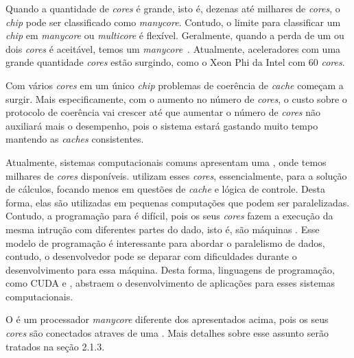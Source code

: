 Quando a quantidade de \textit{cores} é grande, isto é, dezenas até milhares de
\textit{cores}, o \textit{chip} pode ser classificado como \textit{manycore}.
Contudo, o limite para classificar um \textit{chip} em \textit{manycore} ou
\textit{multicore} é flexível. Geralmente, quando a perda de um ou dois
\textit{cores} é aceitável, temos um \textit{manycore}~\cite{Tanenbaum2015}.
Atualmente, aceleradores com uma grande quantidade \textit{cores} estão
surgindo, como o Xeon Phi da Intel com 60 \textit{cores}.

Com vários \textit{cores} em um único \textit{chip} problemas de coerência de
\textit{cache} começam a surgir. Mais especificamente, com o aumento no número
de \textit{cores}, o custo sobre o protocolo de coerência vai crescer até que
aumentar o número de \textit{cores} não auxiliará mais o desempenho, pois o sistema
estará gastando muito tempo mantendo as \textit{caches} consistentes.


Atualmente, sistemas computacionais comuns apresentam uma \gpu, onde temos
milhares de \textit{cores} disponíveis. \gpus utilizam esses \textit{cores},
essencialmente, para a solução de cálculos, focando menos em questões de
\textit{cache} e lógica de controle. Desta forma, elas são utilizadas em
pequenas computações que podem ser paralelizadas. Contudo, a programação para
\gpus é difícil, pois os seus \textit{cores} fazem a execução da mesma intrução
com diferentes partes do dado, isto é, são máquinas \simd. Esse modelo de
programação é interessante para abordar o paralelismo de dados, contudo, o
desenvolvedor pode se deparar com dificuldades durante o desenvolvimento para
essa máquina. Desta forma, linguagens de programação, como CUDA e \opengl,
abstraem o desenvolvimento de aplicações para esses sistemas computacionais.

O \mppa é um processador \textit{manycore} diferente dos apresentados acima,
pois os seus \textit{cores} são conectados atraves de uma \noc. Mais detalhes
sobre esse assunto serão tratados na seção 2.1.3.

